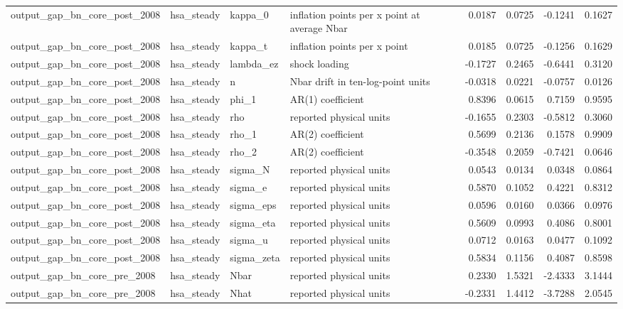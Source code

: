 \begin{tabular}{llllrrrr}
output\_gap\_bn\_core\_post\_2008 & hsa\_steady & kappa\_0 & inflation points per x point at average Nbar & 0.0187 & 0.0725 & -0.1241 & 0.1627 \\
output\_gap\_bn\_core\_post\_2008 & hsa\_steady & kappa\_t & inflation points per x point & 0.0185 & 0.0725 & -0.1256 & 0.1629 \\
output\_gap\_bn\_core\_post\_2008 & hsa\_steady & lambda\_ez & shock loading & -0.1727 & 0.2465 & -0.6441 & 0.3120 \\
output\_gap\_bn\_core\_post\_2008 & hsa\_steady & n & Nbar drift in ten-log-point units & -0.0318 & 0.0221 & -0.0757 & 0.0126 \\
output\_gap\_bn\_core\_post\_2008 & hsa\_steady & phi\_1 & AR(1) coefficient & 0.8396 & 0.0615 & 0.7159 & 0.9595 \\
output\_gap\_bn\_core\_post\_2008 & hsa\_steady & rho & reported physical units & -0.1655 & 0.2303 & -0.5812 & 0.3060 \\
output\_gap\_bn\_core\_post\_2008 & hsa\_steady & rho\_1 & AR(2) coefficient & 0.5699 & 0.2136 & 0.1578 & 0.9909 \\
output\_gap\_bn\_core\_post\_2008 & hsa\_steady & rho\_2 & AR(2) coefficient & -0.3548 & 0.2059 & -0.7421 & 0.0646 \\
output\_gap\_bn\_core\_post\_2008 & hsa\_steady & sigma\_N & reported physical units & 0.0543 & 0.0134 & 0.0348 & 0.0864 \\
output\_gap\_bn\_core\_post\_2008 & hsa\_steady & sigma\_e & reported physical units & 0.5870 & 0.1052 & 0.4221 & 0.8312 \\
output\_gap\_bn\_core\_post\_2008 & hsa\_steady & sigma\_eps & reported physical units & 0.0596 & 0.0160 & 0.0366 & 0.0976 \\
output\_gap\_bn\_core\_post\_2008 & hsa\_steady & sigma\_eta & reported physical units & 0.5609 & 0.0993 & 0.4086 & 0.8001 \\
output\_gap\_bn\_core\_post\_2008 & hsa\_steady & sigma\_u & reported physical units & 0.0712 & 0.0163 & 0.0477 & 0.1092 \\
output\_gap\_bn\_core\_post\_2008 & hsa\_steady & sigma\_zeta & reported physical units & 0.5834 & 0.1156 & 0.4087 & 0.8598 \\
output\_gap\_bn\_core\_pre\_2008 & hsa\_steady & Nbar & reported physical units & 0.2330 & 1.5321 & -2.4333 & 3.1444 \\
output\_gap\_bn\_core\_pre\_2008 & hsa\_steady & Nhat & reported physical units & -0.2331 & 1.4412 & -3.7288 & 2.0545 \\

\end{tabular}

